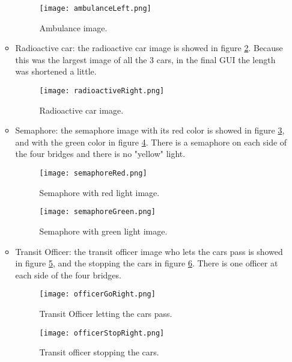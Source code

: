 \documentclass[a4paper,9pt]{article}
\begin{document}
\begin{itemize}
\begin{itemize}
\begin{figure}[H]
\centering
\texttt{[image: ambulanceLeft.png]}
\caption{Ambulance image.}
\label{fig:Ambulance}
 \end{figure} \bigskip

\item Radioactive car: the radioactive car image is showed in figure \ref{fig:Radioactive}. Because this was the largest image of all the 3 cars, in the final GUI the length was shortened a little. 

\begin{figure}[H]
\centering
\texttt{[image: radioactiveRight.png]}
\caption{Radioactive car image.}
\label{fig:Radioactive}
 \end{figure} \bigskip

\item Semaphore: the semaphore image with its red color is showed in figure \ref{fig:SemaphoreRed}, and with the green color in figure \ref{fig:SemaphoreGreen}. There is a semaphore on each side of the four bridges and there is no "yellow" light.

\begin{figure}[H]
\centering
\texttt{[image: semaphoreRed.png]}
\caption{Semaphore with red light image.}
\label{fig:SemaphoreRed}
 \end{figure} \bigskip

\begin{figure}[H]
\centering
\texttt{[image: semaphoreGreen.png]}
\caption{Semaphore with green light image.}
\label{fig:SemaphoreGreen}
 \end{figure} \bigskip
 
\item Transit Officer: the transit officer image who lets the cars pass is showed in figure \ref{fig:OfficerGo}, and the stopping the cars in figure \ref{fig:OfficerStop}. There is one officer at each side of the four bridges.
\begin{figure}[H]
\centering
\texttt{[image: officerGoRight.png]}
\caption{Transit Officer letting the cars pass.}
\label{fig:OfficerGo}
 \end{figure} \bigskip

\begin{figure}[H]
\centering
\texttt{[image: officerStopRight.png]}
\caption{Transit officer stopping the cars.}
\label{fig:OfficerStop}
 \end{figure} \bigskip

\end{itemize}

\end{itemize}
\end{document}
